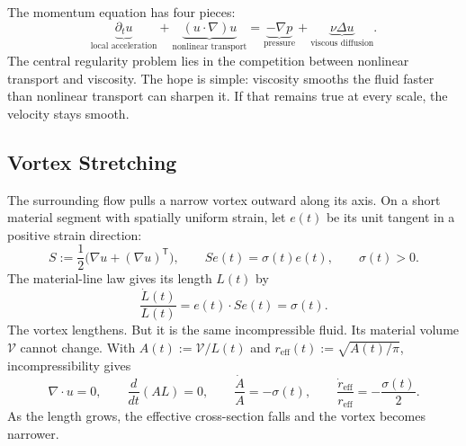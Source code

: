 
The momentum equation has four pieces:
\[
  \underbrace{\partial_t u}_{\text{local acceleration}}
  +
  \underbrace{(u\cdot\nabla)u}_{\text{nonlinear transport}}
  =
  \underbrace{-\nabla p}_{\text{pressure}}
  +
  \underbrace{\nu\Delta u}_{\text{viscous diffusion}}.
\]
The central regularity problem lies in the competition between nonlinear transport and viscosity.
The hope is simple: viscosity smooths the fluid faster than nonlinear transport can sharpen it.
If that remains true at every scale, the velocity stays smooth.

\subsection{Vortex Stretching}\label{sub:ThePerfectlyStretchingVortex}

The surrounding flow pulls a narrow vortex outward along its axis.
On a short material segment with spatially uniform strain, let \(e(t)\) be its unit tangent in a positive strain direction:
\[
  S:=\frac12\bigl(\nabla u+(\nabla u)^{\mathsf T}\bigr),
  \qquad
  Se(t)=\sigma(t)e(t),
  \qquad
  \sigma(t)>0.
\]
The material-line law gives its length \(L(t)\) by
\[
  \frac{\dot L(t)}{L(t)}
  =
  e(t)\cdot Se(t)
  =
  \sigma(t).
\]
The vortex lengthens.
But it is the same incompressible fluid.
Its material volume \(\mathcal V\) cannot change.
With \(A(t):=\mathcal V/L(t)\) and \(r_{\mathrm{eff}}(t):=\sqrt{A(t)/\pi}\), incompressibility gives
\[
  \nabla\cdot u=0,
  \qquad
  \frac{d}{dt}(A L)=0,
  \qquad
  \frac{\dot A}{A}=-\sigma(t),
  \qquad
  \frac{\dot r_{\mathrm{eff}}}{r_{\mathrm{eff}}}
  =
  -\frac{\sigma(t)}{2}.
\]
As the length grows, the effective cross-section falls and the vortex becomes narrower.

